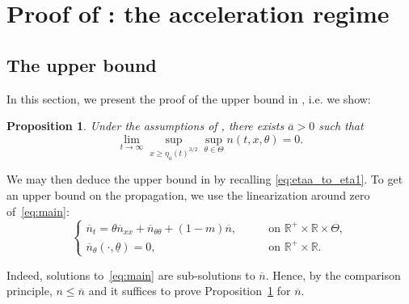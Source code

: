 \documentclass[11pt]{article}    %
\newtheorem{prop}[theorem]{Proposition}
\newcommand{\R}{\mathbb{R}}
\begin{document}
\section{Proof of : the acceleration regime}\label{sec:acceleration}

\subsection{The upper bound}

In this section, we present the proof of the upper bound in , i.e. we show:
\begin{prop}\label{prop:upperboundacc}
	Under the assumptions of , there exists $\overline a>0$ such that
	\[
			\lim_{t\to \infty}  \sup_{x\geq \eta_{\overline{a}}(t)^{3/2}} \sup_{\theta \in \Theta} n(t,x,\theta) = 0.
	\]
\end{prop}
We may then deduce the upper bound in  by recalling \eqref{eq:etaa_to_eta1}. To get an upper bound on the propagation, we use the linearization around zero of~\eqref{eq:main}:
\begin{equation*}
\begin{cases}
\overline n_t = \theta \overline n_{xx} + \overline n_{\theta\theta} + \left( 1 - m \right)  \overline n , &\qquad \text{on } \R^+ \times \R\times\Theta,\\
\overline n_\theta(\cdot,\underline\theta) = 0, & \qquad \text{on } \R^+ \times \R. 
\end{cases}
\end{equation*}


Indeed, solutions to~\eqref{eq:main} are sub-solutions to $\overline n$.  Hence, by the comparison principle, $n \leq \overline n$ and it suffices to prove Proposition~\ref{prop:upperboundacc} for $\overline n$. 
\end{document}
